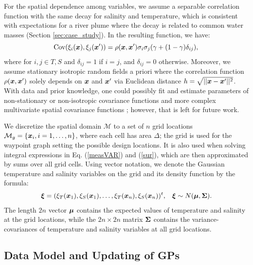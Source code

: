 \documentclass[aoas]{imsart}
\begin{document}
For the spatial dependence among variables, we assume a separable
correlation function with the same decay for salinity and temperature,
which is consistent with expectations for a river plume where the
decay is related to common water masses (Section
\ref{sec:case_study}). In the resulting function, we have:
\begin{equation}\label{gp_corr}
\mbox{Cov}(\xi_i(\bx),\xi_j(\bx')) = \rho(\bx,\bx') \sigma_i \sigma_j (\gamma +(1-\gamma )\delta_{ij}), \\
\end{equation}
where for $i,j \in {T,S}$ and $\delta_{ij}=1$ if $i=j$, and
$\delta_{ij}=0$ otherwise. Moreover, we assume stationary isotropic
random fields a priori where the correlation function $\rho({\boldsymbol x},{\boldsymbol x}')$
solely depends on ${\boldsymbol x}$ and ${\boldsymbol x}'$ via Euclidean distance
$h=\sqrt{||{\boldsymbol x}-{\boldsymbol x}'||^2}$. With data and prior knowledge, one could
possibly fit and estimate parameters of non-stationary or
non-isotropic covariance functions and more complex multivariate
spatial covariance functions
\citep{gneiting2010matern,genton2015cross}; however, that is left for
future work.

We discretize the spatial domain $\mathcal{M}$ to a set of $n$ grid
locations $\mathcal{M}_g = \{{\boldsymbol x}_i, i=1,\ldots,n \}$, where each cell
has area $\Delta$; the grid is used for the waypoint graph setting the
possible design locations. It is also used when solving integral
expressions in Eq. (\ref{measVAR}) and (\ref{sur}), which are then
approximated by sums over all grid cells. Using vector notation, we
denote the Gaussian temperature and salinity variables on the grid and
its density function by the formula:
\begin{equation}\label{prior}
    \bxi = (\xi_T(\bx_1),\xi_S(\bx_1),\ldots,\xi_T(\bx_n),\xi_S(\bx_n))^t, \hspace{3mm}
    \bxi  \sim  N(\bmu, \bSigma). %
\end{equation}
The length $2n$ vector ${\boldsymbol \mu}$ contains the expected values of
temperature and salinity at the grid locations, while the
$2n \times 2n$ matrix ${\boldsymbol \Sigma}$ contains the
variance-covariances of temperature and salinity variables at all grid
locations.

\subsection{Data Model and Updating of GPs}
\end{document}
